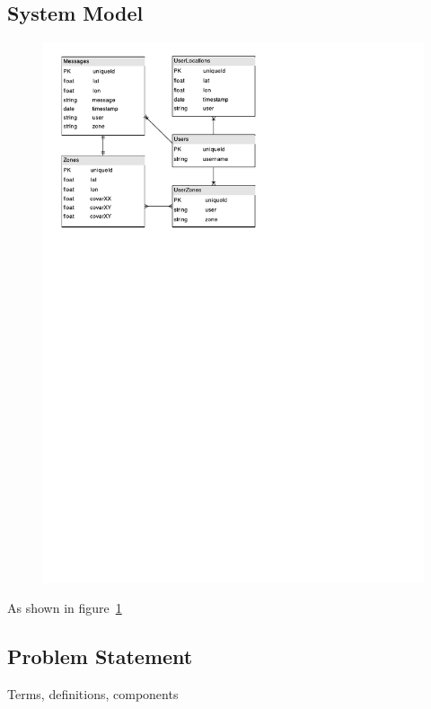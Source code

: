 
\subsection{System Model}
\begin{figure}
\includegraphics{figs/systemModel}
\label{systemModel}
\end{figure}
As shown in figure~\ref{systemModel} 

\subsection{Problem Statement}
Terms, definitions, components
